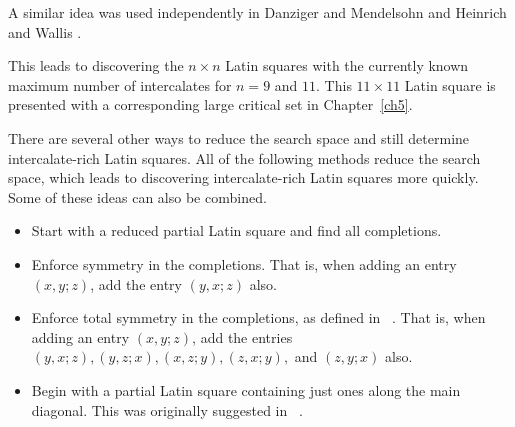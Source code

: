 \documentclass[12pt]{report}
\begin{document}
A similar idea was used independently in Danziger and Mendelsohn
\cite{MR2000g:05035} and Heinrich and Wallis \cite{MR84g:05034}.



This leads to discovering the $n \times n$ Latin squares with the 
currently known maximum number of intercalates for $n = 9$ and $11$.
This $11 \times 11$ Latin square 
is presented with a corresponding large critical set in Chapter~\ref{ch5}.

There are several other ways to reduce the search space and
still determine intercalate-rich Latin squares.  All of
the following methods reduce the search space, which leads
to discovering intercalate-rich Latin squares more quickly.
Some of these ideas can also be combined.  

\begin{itemize}
\item Start with a reduced partial Latin square 
and find all completions.

\item Enforce symmetry in the completions.  That is, when adding an
entry $(x,y;z)$, add the entry $(y,x;z)$ also.

\item Enforce total symmetry in the completions, as defined in 
~\cite{MR80a:05032}.  That is, when adding an entry $(x,y;z)$,
add the entries $(y,x;z), (y,z;x), (x,z;y), (z,x;y),$ and $(z,y;x)$ also.

\item Begin with a partial Latin square containing just ones along the
main diagonal.  This was originally suggested in ~\cite{MR84g:05034}.
\end{itemize}
\end{document}
